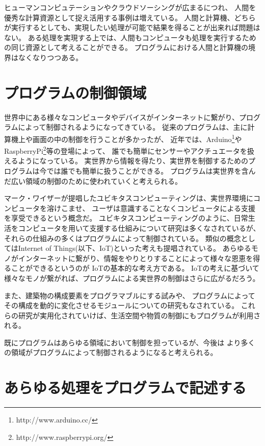 ヒューマンコンピュテーションやクラウドソーシングが広まるにつれ、
人間を優秀な計算資源として捉え活用する事例は増えている。
人間と計算機、どちらが実行するとしても、実現したい処理が可能で結果を得ることが出来れば問題はない。
ある処理を実現する上では、人間もコンピュータも処理を実行するための同じ資源として考えることができる。
プログラムにおける人間と計算機の境界はなくなりつつある。

\section{プログラムの制御領域}\label{sec:are-of-program}

世界中にある様々なコンピュータやデバイスがインターネットに繋がり、プログラムによって制御されるようになってきている。
従来のプログラムは、主に計算機上や画面の中の制御を行うことが多かったが、
近年では、Arduino\footnote{http://www.arduino.cc/}やRaspberryPi\footnote{http://www.raspberrypi.org/}等の登場によって、
誰でも簡単にセンサーやアクチュエータを扱えるようになっている。
実世界から情報を得たり、実世界を制御するためのプログラムは今では誰でも簡単に扱うことができる。
プログラムは実世界を含んだ広い領域の制御のために使われていくと考えられる。

マーク・ワイザーが提唱したユビキタスコンピューティング\cite{weiser1991computer}は、実世界環境にコンピュータを溶けこませ、
ユーザは意識することなくコンピュータによる支援を享受できるという概念だ。
ユビキタスコンピューティングのように、日常生活をコンピュータを用いて支援する仕組みについて研究は多くなされているが、
それらの仕組みの多くはプログラムによって制御されている。
類似の概念としてはInternet of
Things(以下、IoT)\cite{iot}といった考えも提唱されている。
あらゆるモノがインターネットに繋がり、情報をやりとりすることによって様々な恩恵を得ることができるというのが
IoTの基本的な考え方である。
IoTの考えに基づいて様々なモノが繋がれば、プログラムによる実世界の制御はさらに広がるだろう。

また、建築物の構成要素をプログラマブルにする試み\cite{squama}や、
プログラムによってその構成を動的に変化させるモジュールについての研究もなされている。
これらの研究が実用化されていけば、生活空間や物質の制御にもプログラムが利用される。

既にプログラムはあらゆる領域において制御を担っているが、今後は
より多くの領域がプログラムによって制御されるようになると考えられる。

\section{あらゆる処理をプログラムで記述する}\label{ux3042ux3089ux3086ux308bux51e6ux7406ux3092ux30d7ux30edux30b0ux30e9ux30e0ux3067ux8a18ux8ff0ux3059ux308b}

